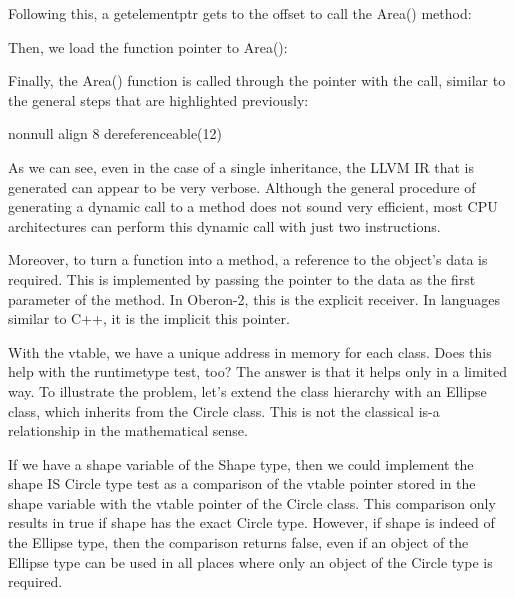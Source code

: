 Following this, a getelementptr gets to the offset to call the Area() method:

\begin{shell}
\end{shell}

Then, we load the function pointer to Area():

\begin{shell}
\end{shell}

Finally, the Area() function is called through the pointer with the call, similar to the general steps that are highlighted previously:

\begin{shell}
  nonnull align 8 dereferenceable(12) %
\end{shell}

As we can see, even in the case of a single inheritance, the LLVM IR that is generated can appear to be very verbose. Although the general procedure of generating a dynamic call to a method does not sound very efficient, most CPU architectures can perform this dynamic call with just two instructions.

Moreover, to turn a function into a method, a reference to the object’s data is required. This is implemented by passing the pointer to the data as the first parameter of the method. In Oberon-2, this is the explicit receiver. In languages similar to C++, it is the implicit this pointer.

With the vtable, we have a unique address in memory for each class. Does this help with the runtimetype test, too? The answer is that it helps only in a limited way. To illustrate the problem, let’s extend the class hierarchy with an Ellipse class, which inherits from the Circle class. This is not the classical is-a relationship in the mathematical sense.

If we have a shape variable of the Shape type, then we could implement the shape IS Circle type test as a comparison of the vtable pointer stored in the shape variable with the vtable pointer of the Circle class. This comparison only results in true if shape has the exact Circle type.
However, if shape is indeed of the Ellipse type, then the comparison returns false, even if an object of the Ellipse type can be used in all places where only an object of the Circle type is required.

